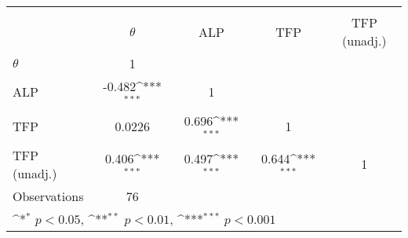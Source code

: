 {
\def\sym#1{\ifmmode^{#1}\else\(^{#1}\)\fi}
\begin{tabular}{l*{4}{c}}
\toprule
                &\multicolumn{4}{c}{}                                                       \\
                & $\theta$         &      ALP         &      TFP         &TFP (unadj.)         \\
\midrule
$\theta$        &        1         &                  &                  &                  \\
ALP             &   -0.482\sym{***}&        1         &                  &                  \\
TFP             &   0.0226         &    0.696\sym{***}&        1         &                  \\
TFP (unadj.)    &    0.406\sym{***}&    0.497\sym{***}&    0.644\sym{***}&        1         \\
\midrule
Observations    &       76         &                  &                  &                  \\
\bottomrule
\multicolumn{5}{l}{\footnotesize \sym{*} \(p<0.05\), \sym{**} \(p<0.01\), \sym{***} \(p<0.001\)}\\
\end{tabular}
}
